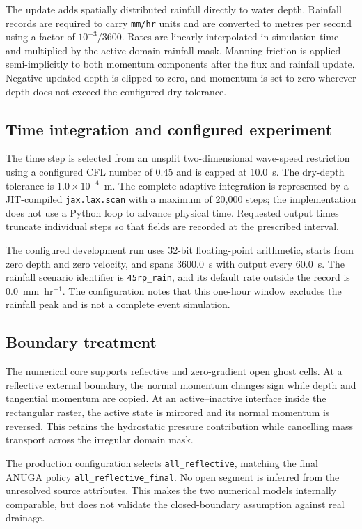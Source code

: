 The update adds spatially distributed rainfall directly to water depth.
Rainfall records are required to carry \texttt{mm/hr} units and are converted
to metres per second using a factor of \(10^{-3}/3600\).  Rates are linearly
interpolated in simulation time and multiplied by the active-domain rainfall
mask.  Manning friction is applied semi-implicitly to both momentum
components after the flux and rainfall update.  Negative updated depth is
clipped to zero, and momentum is set to zero wherever depth does not exceed the
configured dry tolerance.

\subsection{Time integration and configured experiment}

The time step is selected from an unsplit two-dimensional wave-speed
restriction using a configured CFL number of 0.45 and is capped at 10.0~s.
The dry-depth tolerance is \(1.0\times10^{-4}\)~m.  The complete adaptive
integration is represented by a JIT-compiled \texttt{jax.lax.scan} with a
maximum of 20,000 steps; the implementation does not use a Python loop to
advance physical time.  Requested output times truncate individual steps so
that fields are recorded at the prescribed interval.

The configured development run uses 32-bit floating-point arithmetic, starts
from zero depth and zero velocity, and spans 3600.0~s with output every
60.0~s.  The rainfall scenario identifier is
\nolinkurl{45rp_rain}, and its default rate outside the record is
0.0~mm~hr\(^{-1}\).  The configuration notes that this one-hour window
excludes the rainfall peak and is not a complete event simulation.

\subsection{Boundary treatment}

The numerical core supports reflective and zero-gradient open ghost cells.
At a reflective external boundary, the normal momentum changes sign while
depth and tangential momentum are copied.  At an active--inactive interface
inside the rectangular raster, the active state is mirrored and its normal
momentum is reversed.  This retains the hydrostatic pressure contribution
while cancelling mass transport across the irregular domain mask.

The production configuration selects \texttt{all\_reflective}, matching the
final ANUGA policy \texttt{all\_reflective\_final}.  No open segment is
inferred from the unresolved source attributes.  This makes the two numerical
models internally comparable, but does not validate the closed-boundary
assumption against real drainage.


